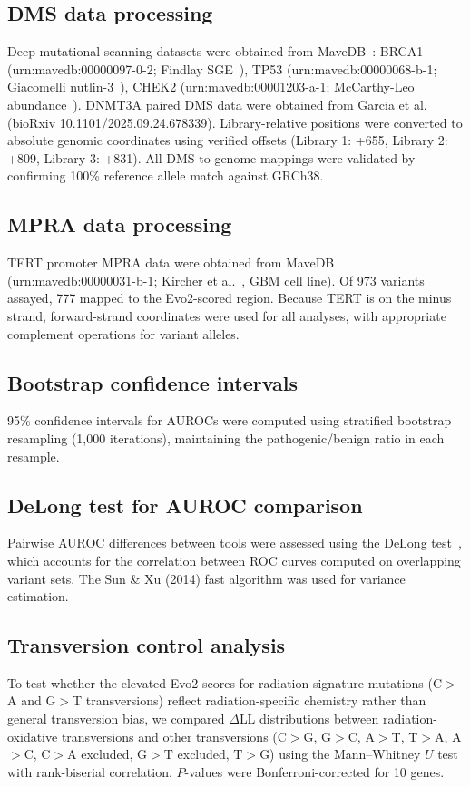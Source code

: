 \documentclass[11pt]{article}
\begin{document}
\subsection*{DMS data processing}
Deep mutational scanning datasets were obtained from MaveDB~\cite{MaveDB_2019}:
BRCA1 (urn:mavedb:00000097-0-2; Findlay SGE~\cite{BRCA1_DMS_2018}),
TP53 (urn:mavedb:00000068-b-1; Giacomelli nutlin-3~\cite{TP53_DMS_2018}),
CHEK2 (urn:mavedb:00001203-a-1; McCarthy-Leo abundance~\cite{CHEK2_DMS_2024}).
DNMT3A paired DMS data were obtained from Garcia et al.~\cite{DNMT3A_DMS_2025}
(bioRxiv 10.1101/2025.09.24.678339). Library-relative positions were converted to
absolute genomic coordinates using verified offsets (Library 1: +655, Library 2:
+809, Library 3: +831). All DMS-to-genome mappings were validated by confirming
100\% reference allele match against GRCh38.

\subsection*{MPRA data processing}
TERT promoter MPRA data were obtained from MaveDB
(urn:mavedb:00000031-b-1; Kircher et al.~\cite{TERT_MPRA_2019}, GBM cell line).
Of 973 variants assayed, 777 mapped to the Evo2-scored region. Because TERT is
on the minus strand, forward-strand coordinates were used for all analyses, with
appropriate complement operations for variant alleles.

\subsection*{Bootstrap confidence intervals}
95\% confidence intervals for AUROCs were computed using stratified bootstrap
resampling (1,000 iterations), maintaining the pathogenic/benign ratio in each
resample.

\subsection*{DeLong test for AUROC comparison}
Pairwise AUROC differences between tools were assessed using the DeLong
test~\cite{DeLong_1988}, which accounts for the correlation between ROC curves
computed on overlapping variant sets. The Sun \& Xu (2014) fast algorithm was
used for variance estimation.

\subsection*{Transversion control analysis}
To test whether the elevated Evo2 scores for radiation-signature mutations
(C$>$A and G$>$T transversions) reflect radiation-specific chemistry rather than
general transversion bias, we compared $\Delta$LL distributions between
radiation-oxidative transversions and other transversions
(C$>$G, G$>$C, A$>$T, T$>$A, A$>$C, C$>$A excluded, G$>$T excluded, T$>$G)
using the Mann--Whitney $U$ test with rank-biserial correlation. $P$-values were
Bonferroni-corrected for 10 genes.
\end{document}
